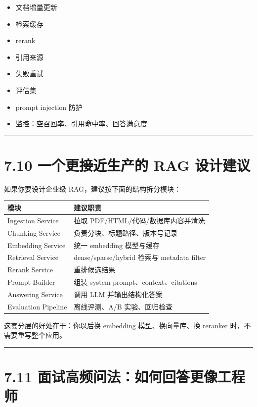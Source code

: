 \begin{itemize}[leftmargin=2em]
\item 文档增量更新
\item 检索缓存
\item rerank
\item 引用来源
\item 失败重试
\item 评估集
\item prompt injection 防护
\item 监控：空召回率、引用命中率、回答满意度
\end{itemize}

\bigskip\hrule\bigskip

\section{7.10 一个更接近生产的 RAG 设计建议}

如果你要设计企业级 RAG，建议按下面的结构拆分模块：


\begingroup
\scriptsize
\setlength{\tabcolsep}{3pt}
\begin{longtable}{|p{}|p{}|}
\hline
模块 & 建议职责 \\ \hline
Ingestion Service & 拉取 PDF/HTML/代码/数据库内容并清洗 \\ \hline
Chunking Service & 负责分块、标题路径、版本号记录 \\ \hline
Embedding Service & 统一 embedding 模型与缓存 \\ \hline
Retrieval Service & dense/sparse/hybrid 检索与 metadata filter \\ \hline
Rerank Service & 重排候选结果 \\ \hline
Prompt Builder & 组装 system prompt、context、citations \\ \hline
Answering Service & 调用 LLM 并输出结构化答案 \\ \hline
Evaluation Pipeline & 离线评测、A/B 实验、回归检查 \\ \hline
\end{longtable}
\endgroup

这套分层的好处在于：你以后换 embedding 模型、换向量库、换 reranker 时，不需要重写整个应用。


\bigskip\hrule\bigskip

\section{7.11 面试高频问法：如何回答更像工程师}

